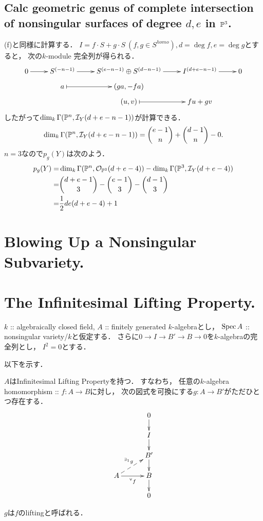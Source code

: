 \documentclass[a4paper]{jsarticle}
\begin{document}
    \subsection{Calc geometric genus of 
        complete intersection of nonsingular surfaces of degree $d,e$ in $\mathbb{P}^3$.}
    (f)と同様に計算する．
    $I=f \cdot S+g \cdot S \ (f,g \in S^{homo}), d=\deg f, e=\deg g$とすると，
    次の$k$-module 完全列が得られる．
    \[
    \xymatrix@R=5pt
    {
        0 \ar[r]
        & S^{(-n-1)} \ar[r]
        & S^{(e-n-1)} \oplus S^{(d-n-1)} \ar[r]
        & I^{(d+e-n-1)} \ar[r]
        & 0 \\
        {} & a \ar@{|->}[r]& (ga, -fa) & {} & {} \\
        {} & {} & (u, v) \ar@{|->}[r]& fu+gv & {}
    }
    \]
    したがって$\dim_k \Gamma(\mathbb{P}^n, \mathcal{I}_Y(d+e-n-1))$が計算できる．
    \[
        \dim_k \Gamma(\mathbb{P}^n, \mathcal{I}_Y(d+e-n-1))
        =\binom{e-1}{n}+\binom{d-1}{n}-0.
    \]
    $n=3$なので$p_g(Y)$は次のよう．
    \begin{align*}
        p_g(Y)
        =&\dim_k \Gamma(\mathbb{P}^n, \mathcal{O}_{\mathbb{P}^3}(d+e-4))-\dim_k \Gamma(\mathbb{P}^3, \mathcal{I}_Y(d+e-4)) \\
        =&\binom{d+e-1}{3}-\binom{e-1}{3}-\binom{d-1}{3} \\
        =&\frac{1}{2}de(d+e-4)+1
    \end{align*}

\section{Blowing Up a Nonsingular Subvariety.} %

\section{The Infinitesimal Lifting Property.} %
    $k$ :: algebraically closed field,
    $A$ :: finitely generated $k$-algebraとし，
    $\operatorname{Spec} A$ :: nonsingular variety/$k$と仮定する．
    さらに$0 \to I \to B' \to B \to 0$を$k$-algebraの完全列とし，
    $I^2=0$とする．

    以下を示す．
    \begin{Thm}
        $A$はInfinitesimal Lifting Propertyを持つ．
        すなわち，
        任意の$k$-algebra homomorphism :: $f: A \to B$に対し，
        次の図式を可換にする$g: A \to B'$がただひとつ存在する．
        \[
        \xymatrix@R=15pt@C=30pt
        {
            {} & 0 \ar[d]\\
            {} & I \ar[d]\\
            {} & B'\ar[d]\\
            A \ar[r]_-{{}^{\forall} f} \ar@{-->}[ru]^{{}^{\exists_1} g}& B \ar[d]\\
            {} & 0 \\
        }
        \]
    \end{Thm}
    $g$は$f$のliftingと呼ばれる．
    
\end{document}
